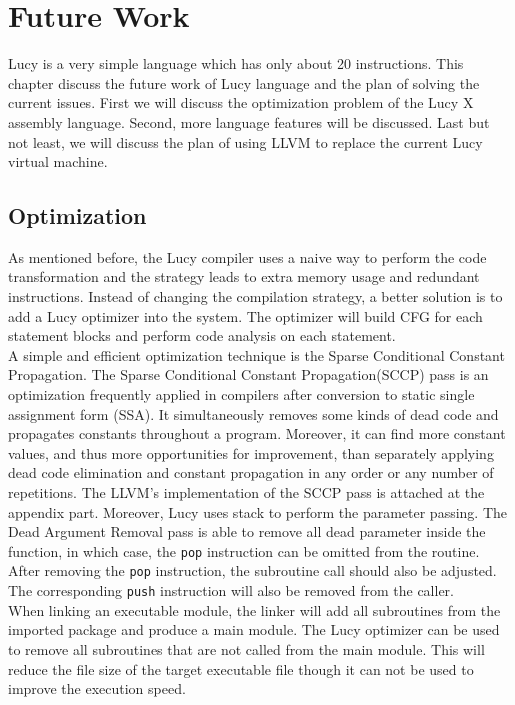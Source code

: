 \chapter{Future Work}
Lucy is a very simple language which has only about 20 instructions. This chapter discuss the future work of Lucy language and the plan of solving the current issues. First we will discuss the optimization problem of the Lucy X assembly language. Second, more language features will be discussed. Last but not least, we will discuss the plan of using LLVM to replace the current Lucy virtual machine.


\section{Optimization}
As mentioned before, the Lucy compiler uses a naive way to perform the code transformation and the strategy leads to extra memory usage and redundant instructions. Instead of changing the compilation strategy, a better solution is to add a Lucy optimizer into the system. The optimizer will build CFG for each statement blocks and perform code analysis on each statement. \\
A simple and efficient optimization technique is the Sparse Conditional Constant Propagation. The Sparse Conditional Constant Propagation(SCCP) pass is an optimization frequently applied in compilers after conversion to static single assignment form (SSA). It simultaneously removes some kinds of dead code and propagates constants throughout a program. Moreover, it can find more constant values, and thus more opportunities for improvement, than separately applying dead code elimination and constant propagation in any order or any number of repetitions. The LLVM's implementation of the SCCP pass is attached at the appendix part.
Moreover, Lucy uses stack to perform the parameter passing. The Dead Argument Removal pass is able to remove all dead parameter inside the function, in which case, the \texttt{pop} instruction can be omitted from the routine. After removing the \texttt{pop} instruction, the subroutine call should also be adjusted. The corresponding \texttt{push} instruction will also be removed from the caller. \\
When linking an executable module, the linker will add all subroutines from the imported package and produce a main module. The Lucy optimizer can be used to remove all subroutines that are not called from the main module. This will reduce the file size of the target executable file though it can not be used to improve the execution speed.


